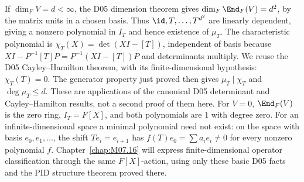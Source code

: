 If $\dim_FV=d<\infty$, the D05 dimension theorem gives
$\dim_F\End_F(V)=d^2$, by the matrix units in a chosen basis.
Thus $\id,T,\ldots,T^{d^2}$ are linearly dependent, giving
a nonzero polynomial in $I_T$ and hence existence of $\mu_T$.
The characteristic polynomial is
$\chi_T(X)=\det(XI-[T])$, independent of basis because
$XI-P^{-1}[T]P=P^{-1}(XI-[T])P$ and determinants multiply.
We reuse the D05 Cayley--Hamilton theorem, with its
finite-dimensional hypothesis: $\chi_T(T)=0$.
The generator property just proved then gives
$\mu_T\mid\chi_T$ and $\deg\mu_T\le d$.
These are applications of the canonical D05 determinant and
Cayley--Hamilton results, not a second proof of them here.
For $V=0$, $\End_F(V)$ is the zero ring, $I_T=F[X]$,
and both polynomials are $1$ with degree zero.
For an infinite-dimensional space a minimal polynomial need
not exist: on the space with basis $e_0,e_1,\ldots$, the shift
$Te_i=e_{i+1}$ has $f(T)e_0=\sum a_ie_i\ne0$ for every
nonzero polynomial $f$.
Chapter~\ref{chap:M07.16} will express finite-dimensional operator
classification through the same $F[X]$-action, using only these
basic D05 facts and the PID structure theorem proved there.
